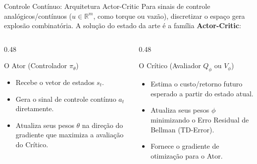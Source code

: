 \documentclass[11pt, aspectratio=169]{beamer}
\begin{document}
\begin{frame}{Controle Contínuo: Arquitetura Actor-Critic}
    Para sinais de controle analógicos/contínuos ($u \in \mathbb{R}^m$, como torque ou vazão), discretizar o espaço gera explosão combinatória. A solução do estado da arte é a família \textbf{Actor-Critic}:
    
    \vspace{0.3cm}
    \begin{columns}[T]
        \begin{column}{0.48\textwidth}
            \begin{block}{O Ator (Controlador $\pi_\theta$)}
                \begin{itemize}
                    \item Recebe o vetor de estados $s_t$.
                    \item Gera o sinal de controle contínuo $a_t$ diretamente.
                    \item Atualiza seus pesos $\theta$ na direção do gradiente que maximiza a avaliação do Crítico.
                \end{itemize}
            \end{block}
        \end{column}
        
        \begin{column}{0.48\textwidth}
            \begin{block}{O Crítico (Avaliador $Q_\phi$ ou $V_\phi$)}
                \begin{itemize}
                    \item Estima o custo/retorno futuro esperado a partir do estado atual.
                    \item Atualiza seus pesos $\phi$ minimizando o Erro Residual de Bellman (TD-Error).
                    \item Fornece o gradiente de otimização para o Ator.
                \end{itemize}
            \end{block}
        \end{column}
    \end{columns}
\end{frame}
\end{document}
